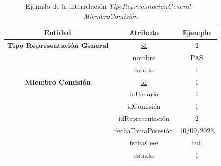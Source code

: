 \begin{itemize}
    \begin{table}[H]
    \centering
        \begin{tabular}{ | c | c | c |  }
             \hline
                 \textbf{Entidad} & \textbf{Atributo} & \textbf{Ejemplo}\\       
             \hline
                 \textbf{Tipo Representación General}  & \underline{id} & 2\\
                  & nombre & PAS\\
                  & estado & 1\\
             \hline
                 \textbf{Miembro Comisión}  & \underline{id} & 1\\
                  & idUsuario & 1\\
                  & idComisión & 1\\
                  & idRepresentación & 2\\
                  & fechaTomaPosesión & 10/09/2023\\
                  & fechaCese & null\\
                  & estado & 1\\
        \end{tabular}
        \caption{Ejemplo de la interrelación \textit{TipoRepresentaciónGeneral - MiembroComisión}}
        \label{table:I-TipRG-MiCom}
    \end{table}
\end{itemize}


